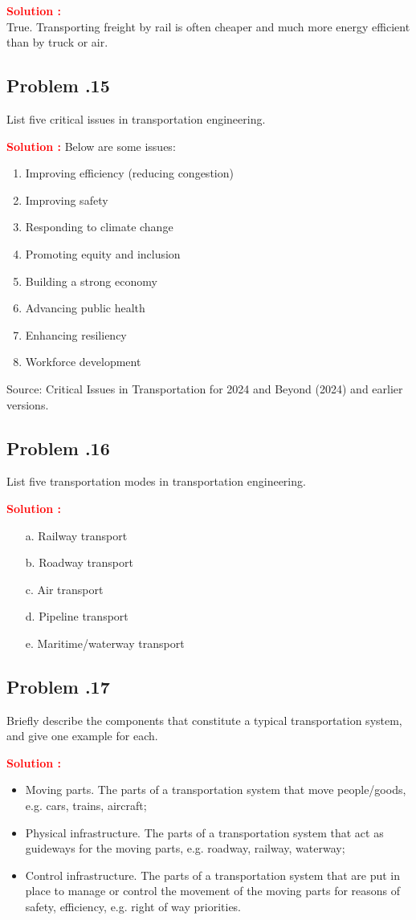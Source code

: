 \documentclass[12pt]{article}
\newcommand{\customsubsection}[1]{
  \subsection*{Problem \thesection.#1}
}
\begin{document}
\textbf{\textcolor{red}{Solution :}} \\
True. Transporting freight by rail is often cheaper and much more energy efficient than by truck or air.
\newpage


\customsubsection{15}
List five critical issues in transportation engineering.


\textbf{\textcolor{red}{Solution :}} 
Below are some issues:
\begin{enumerate}
    \item Improving efficiency (reducing congestion)
    \item Improving safety
    \item Responding to climate change
    \item Promoting equity and inclusion
    \item Building a strong economy
    \item Advancing public health
    \item Enhancing resiliency
    \item Workforce development
\end{enumerate}

\noindent Source: Critical Issues in Transportation for 2024 and Beyond (2024) and earlier versions.

\newpage

\customsubsection{16}
List five transportation modes in transportation engineering. 


\textbf{\textcolor{red}{Solution :}} 
\begin{enumerate}
    \item [a.] Railway transport
    \item [b.] Roadway transport
    \item [c.] Air transport
    \item [d.] Pipeline transport
    \item [e.] Maritime/waterway transport
\end{enumerate}
\newpage



\customsubsection{17}
Briefly describe the components that constitute a typical transportation system, and give one example for each.


\textbf{\textcolor{red}{Solution :}} 
\begin{itemize}
    \item Moving parts. The parts of a transportation system that move people/goods, e.g. cars, trains, aircraft;
    \item  Physical infrastructure. The parts of a transportation system that act as guideways for the moving parts, e.g. roadway, railway, waterway;
    \item Control infrastructure. The parts of a transportation system that are put in place to manage or control the movement of the moving parts for reasons of safety, efficiency, e.g. right of way priorities.
\end{itemize}
\newpage
\end{document}
